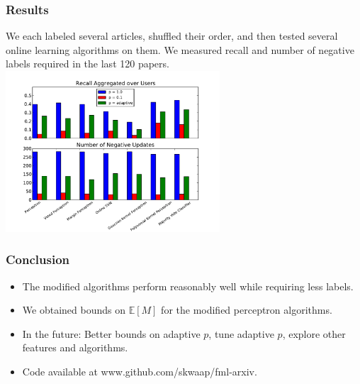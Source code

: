 \documentclass{beamer}
\begin{document}
\begin{frame}
\frametitle{Results}
We each labeled several articles, shuffled their order, and then tested several online learning algorithms on them.  We measured recall and number of negative labels required in the last 120 papers.
\includegraphics[width=0.6\textwidth]{EveryoneRecallPaper.pdf}
\end{frame}


\begin{frame}
\frametitle{Conclusion}
\begin{itemize}
\item The modified algorithms perform reasonably well while requiring less labels.
\item We obtained bounds on  $\mathbb{E}[M]$ for the modified perceptron algorithms.
\item In the future: Better bounds on adaptive $p$, tune adaptive $p$, explore other features and algorithms.
\item Code available at www.github.com/skwaap/fml-arxiv.
\end{itemize}
\end{frame}
\end{document}
